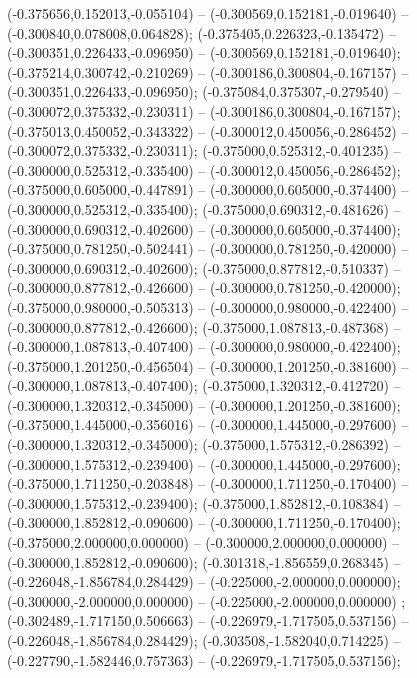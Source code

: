  (-0.375656,0.152013,-0.055104) -- (-0.300569,0.152181,-0.019640) -- (-0.300840,0.078008,0.064828);
 (-0.375405,0.226323,-0.135472) -- (-0.300351,0.226433,-0.096950) -- (-0.300569,0.152181,-0.019640);
 (-0.375214,0.300742,-0.210269) -- (-0.300186,0.300804,-0.167157) -- (-0.300351,0.226433,-0.096950);
 (-0.375084,0.375307,-0.279540) -- (-0.300072,0.375332,-0.230311) -- (-0.300186,0.300804,-0.167157);
 (-0.375013,0.450052,-0.343322) -- (-0.300012,0.450056,-0.286452) -- (-0.300072,0.375332,-0.230311);
 (-0.375000,0.525312,-0.401235) -- (-0.300000,0.525312,-0.335400) -- (-0.300012,0.450056,-0.286452);
 (-0.375000,0.605000,-0.447891) -- (-0.300000,0.605000,-0.374400) -- (-0.300000,0.525312,-0.335400);
 (-0.375000,0.690312,-0.481626) -- (-0.300000,0.690312,-0.402600) -- (-0.300000,0.605000,-0.374400);
 (-0.375000,0.781250,-0.502441) -- (-0.300000,0.781250,-0.420000) -- (-0.300000,0.690312,-0.402600);
 (-0.375000,0.877812,-0.510337) -- (-0.300000,0.877812,-0.426600) -- (-0.300000,0.781250,-0.420000);
 (-0.375000,0.980000,-0.505313) -- (-0.300000,0.980000,-0.422400) -- (-0.300000,0.877812,-0.426600);
 (-0.375000,1.087813,-0.487368) -- (-0.300000,1.087813,-0.407400) -- (-0.300000,0.980000,-0.422400);
 (-0.375000,1.201250,-0.456504) -- (-0.300000,1.201250,-0.381600) -- (-0.300000,1.087813,-0.407400);
 (-0.375000,1.320312,-0.412720) -- (-0.300000,1.320312,-0.345000) -- (-0.300000,1.201250,-0.381600);
 (-0.375000,1.445000,-0.356016) -- (-0.300000,1.445000,-0.297600) -- (-0.300000,1.320312,-0.345000);
 (-0.375000,1.575312,-0.286392) -- (-0.300000,1.575312,-0.239400) -- (-0.300000,1.445000,-0.297600);
 (-0.375000,1.711250,-0.203848) -- (-0.300000,1.711250,-0.170400) -- (-0.300000,1.575312,-0.239400);
 (-0.375000,1.852812,-0.108384) -- (-0.300000,1.852812,-0.090600) -- (-0.300000,1.711250,-0.170400);
 (-0.375000,2.000000,0.000000) -- (-0.300000,2.000000,0.000000) -- (-0.300000,1.852812,-0.090600);
 (-0.301318,-1.856559,0.268345) -- (-0.226048,-1.856784,0.284429) -- (-0.225000,-2.000000,0.000000);
 (-0.300000,-2.000000,0.000000) -- (-0.225000,-2.000000,0.000000) ;
 (-0.302489,-1.717150,0.506663) -- (-0.226979,-1.717505,0.537156) -- (-0.226048,-1.856784,0.284429);
 (-0.303508,-1.582040,0.714225) -- (-0.227790,-1.582446,0.757363) -- (-0.226979,-1.717505,0.537156);
